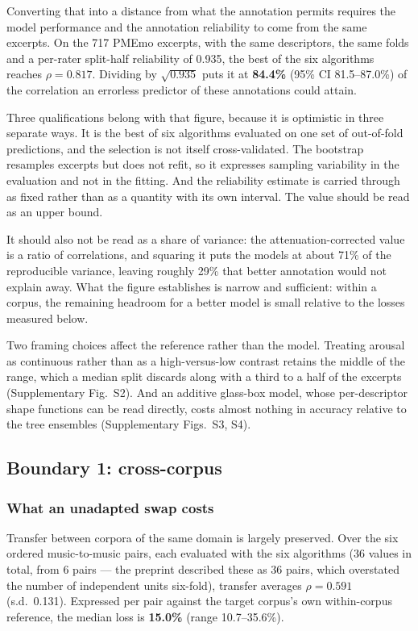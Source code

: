 Converting that into a distance from what the annotation permits requires the
model performance and the annotation reliability to come from the same
excerpts. On the 717 PMEmo excerpts, with the same descriptors, the same folds
and a per-rater split-half reliability of 0.935, the best of the six
algorithms reaches $\rho = 0.817$. Dividing by $\sqrt{0.935}$ puts it at
\textbf{84.4\%} (95\% CI 81.5--87.0\%) of the correlation an errorless
predictor of these annotations could attain.

Three qualifications belong with that figure, because it is optimistic in
three separate ways. It is the best of six algorithms evaluated on one set of
out-of-fold predictions, and the selection is not itself cross-validated. The
bootstrap resamples excerpts but does not refit, so it expresses sampling
variability in the evaluation and not in the fitting. And the reliability
estimate is carried through as fixed rather than as a quantity with its own
interval. The value should be read as an upper bound.

It should also not be read as a share of variance: the attenuation-corrected
value is a ratio of correlations, and squaring it puts the models at about
71\% of the reproducible variance, leaving roughly 29\% that better annotation
would not explain away. What the figure establishes is narrow and sufficient:
within a corpus, the remaining headroom for a better model is small relative
to the losses measured below.

Two framing choices affect the reference rather than the model. Treating
arousal as continuous rather than as a high-versus-low contrast retains the
middle of the range, which a median split discards along with a third to a
half of the excerpts (Supplementary Fig.~S2). And an additive glass-box model,
whose per-descriptor shape functions can be read directly, costs almost
nothing in accuracy relative to the tree ensembles (Supplementary Figs.~S3,
S4).

\subsection{Boundary 1: cross-corpus}
\label{sec:corpus}

\subsubsection{What an unadapted swap costs}

Transfer between corpora of the same domain is largely preserved. Over the six
ordered music-to-music pairs, each evaluated with the six algorithms (36
values in total, from 6 pairs --- the preprint described these as 36 pairs,
which overstated the number of independent units six-fold), transfer averages
$\rho = 0.591$ (s.d.\ 0.131). Expressed per pair against the target corpus's
own within-corpus reference, the median loss is \textbf{15.0\%} (range
10.7--35.6\%).

